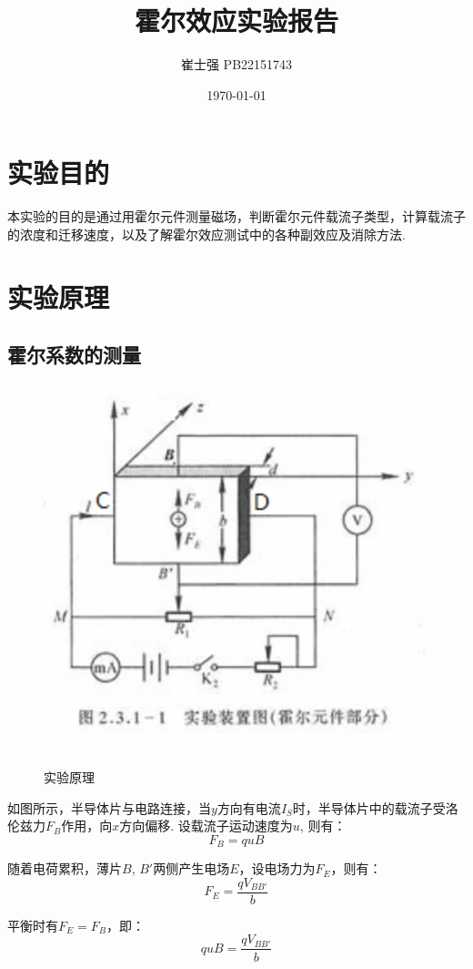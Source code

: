 \documentclass[UTF8]{ctexart}
\title{霍尔效应实验报告}
\author{崔士强 PB22151743}
\date{\today}
\begin{document}
\maketitle
\section{实验目的}
本实验的目的是通过用霍尔元件测量磁场，判断霍尔元件载流子类型，计算载流子的浓度和迁移速度，以及了解霍尔效应测试中的各种副效应及消除方法.
\section{实验原理}
\subsection{霍尔系数的测量}
\begin{figure}[h]
  \centering
  \includegraphics[scale=0.3]{p1.png}
  \caption{实验原理}
\end{figure}
如图所示，半导体片与电路连接，当$y$方向有电流$I_S$时，半导体片中的载流子受洛伦兹力$F_B$作用，向$x$方向偏移. 设载流子运动速度为$u$,
则有：
\[F_B = quB\]

随着电荷累积，薄片$B$, $B'$两侧产生电场$E$，设电场力为$F_E$，则有：
\[F_E = \frac{qV_{BB'}}{b}\]

平衡时有$F_E = F_B$，即：
\[quB = \frac{qV_{BB'}}{b}\]
\end{document}
